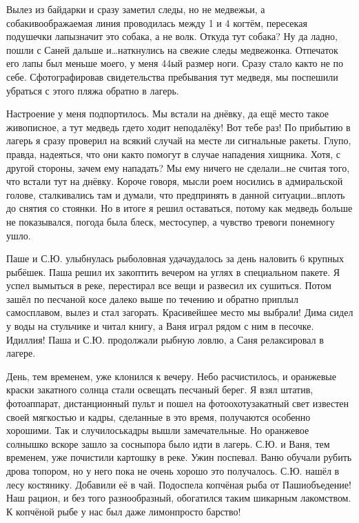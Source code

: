 Вылез из байдарки и сразу заметил следы, но не медвежьи, а собаки\mdash воображаемая линия проводилась между 1 и 4 когтём, пересекая подушечки лапы\mdash значит это собака, а не волк. Откуда тут собака? Ну да ладно, пошли с Саней дальше и\ldots  наткнулись на свежие следы медвежонка. Отпечаток его лапы был меньше моего, у меня 44\sdash ый размер ноги. Сразу стало как\sdash то не по себе. Сфотографировав свидетельства пребывания тут медведя, мы поспешили убраться с этого пляжа обратно в лагерь. 

Настроение у меня подпортилось. Мы встали на днёвку, да ещё место такое живописное, а тут медведь где\sdash то ходит неподалёку! Вот тебе раз! По прибытию в лагерь я сразу проверил на всякий случай на месте ли сигнальные ракеты. Глупо, правда, надеяться, что они как\sdash то помогут в случае нападения хищника. Хотя, с другой стороны, зачем ему нападать? Мы ему ничего не сделали\ldots  не считая того, что встали тут на днёвку. Короче говоря, мысли роем носились в адмиральской голове, сталкивались там и думали, что предпринять в данной ситуации\ldots  вплоть до снятия со стоянки. Но в итоге я решил оставаться, потому как медведь больше не показывался, погода была блеск, место\mdash супер, а чувство тревоги понемногу ушло. 

Паше и С.Ю. улыбнулась рыболовная удача\mdash удалось за день наловить 6 крупных рыбёшек. Паша решил их закоптить вечером на углях в специальном пакете. Я успел вымыться в реке, перестирал все вещи и развесил их сушиться. Потом зашёл по песчаной косе далеко выше по течению и обратно приплыл самосплавом, вылез и стал загорать. Красивейшее место мы выбрали! Дима сидел у воды на стульчике и читал книгу, а Ваня играл рядом с ним в песочке. Идиллия! Паша и С.Ю. продолжали рыбную ловлю, а Саня релаксировал в лагере.

День, тем временем, уже клонился к вечеру. Небо расчистилось, и оранжевые краски закатного солнца стали освещать песчаный берег. Я взял штатив, фотоаппарат, дистанционный пульт и пошел на фотоохоту\mdash закатный свет известен своей мягкостью и кадры, сделанные в это время, получаются особенно хорошими. Так и случилось\mdash кадры вышли замечательные. Но оранжевое солнышко вскоре зашло за сосны\mdash пора было идти в лагерь. С.Ю. и Ваня, тем временем, уже почистили картошку в реке. Ужин поспевал. Ваню обучали рубить дрова топором, но у него пока не очень хорошо это получалось. С.Ю. нашёл в лесу костянику. Добавили её в чай. Подоспела копчёная рыба от Паши\mdash объедение! Наш рацион, и без того разнообразный, обогатился таким шикарным лакомством. К копчёной рыбе у нас был даже лимон\mdash просто барство! 

